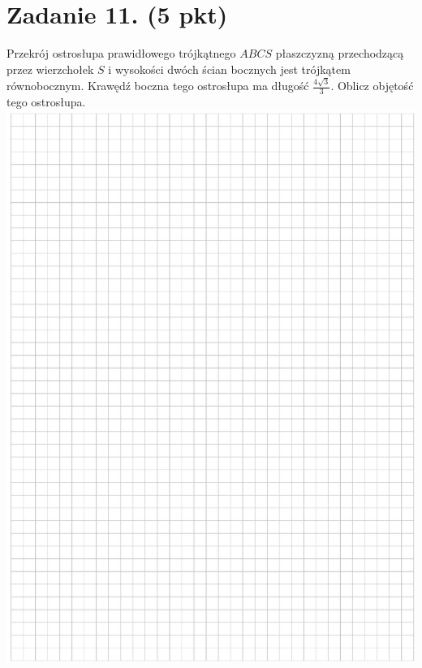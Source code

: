 \documentclass[10pt]{article}
\begin{document}
\section*{Zadanie 11. (5 pkt)}
Przekrój ostrosłupa prawidłowego trójkątnego \(A B C S\) płaszczyzną przechodzącą przez wierzchołek \(S\) i wysokości dwóch ścian bocznych jest trójkątem równobocznym. Krawędź boczna tego ostrosłupa ma długość \(\frac{4 \sqrt{3}}{3}\). Oblicz objętość tego ostrosłupa.\\
\includegraphics[max width=\textwidth, center]{2024_11_21_7379bf55d75dd0fc4c58g-18}\\
\end{document}
